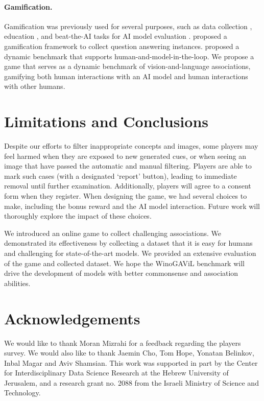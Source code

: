 \documentclass{article}
\newcommand{\ouracronym}[0]{WinoGAViL}
\begin{document}
\paragraph{Gamification.} Gamification was previously used for several purposes, such as data collection \cite{ipeirotis2014quizz,von2004labeling,eisenschlos2021fool}, education \cite{hays2017game,bustamante2021cultural}, and beat-the-AI tasks for AI model evaluation \cite{bartolo2020beat,attenberg2015beat,chattopadhyay2017evaluating}.   \citet{talmor2022commonsenseqa} proposed a gamification framework to collect question answering instances.
\citet{kiela2021dynabench} proposed a dynamic benchmark that supports human-and-model-in-the-loop.
We propose a game that serves as a dynamic benchmark of vision-and-language associations, gamifying both human interactions with an AI model and human interactions with other humans. 
\section{Limitations and Conclusions}
\label{sec:limitations_and_conclusions}
Despite our efforts to filter inappropriate concepts and images, some players may feel harmed when they are exposed to new generated cues, or when seeing an image that have passed the automatic and manual filtering. Players are able to mark such cases (with a designated `report' button), leading to immediate removal until further examination. Additionally, players will agree to a consent form when they register. When designing the game, we had several choices to make, including the bonus reward and the AI model interaction. Future work will thoroughly explore the impact of these choices.

We introduced an online game to collect challenging associations. We demonstrated its effectiveness by collecting a dataset that it is easy for humans and challenging for state-of-the-art models. We provided an extensive evaluation of the game and collected dataset. We hope the \ouracronym{} benchmark will drive the development of models with better commonsense and association abilities.

 
\section*{Acknowledgements}
We would like to thank Moran Mizrahi for a feedback regarding the players survey. We would also like to thank Jaemin Cho, Tom Hope, Yonatan Belinkov, Inbal Magar and Aviv Shamsian. This work was supported in part by the Center for Interdisciplinary Data Science Research at the Hebrew University of Jerusalem, and a research grant no. 2088 from the Israeli Ministry of Science and Technology. 


\end{document}
